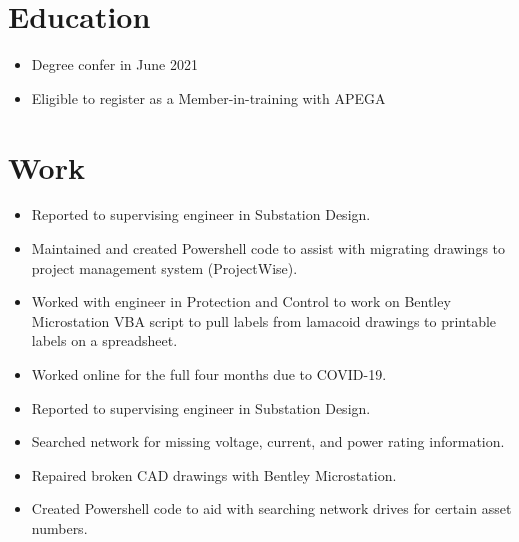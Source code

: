 \documentclass{lsanche_cv}
\begin{document}

\medskip


\smallskip


\begin{multicols*}{2}
  \section{Education}
    \begin{itemize}
      \item Degree confer in June 2021
      \item Eligible to register as a Member-in-training with APEGA
    \end{itemize}

  \section{Work}
    \begin{itemize}
      \item Reported to supervising engineer in Substation Design.
      \item Maintained and created Powershell code to assist with migrating drawings to project management system (ProjectWise).
      \item Worked with engineer in Protection and Control to work on Bentley Microstation VBA script to pull labels from lamacoid drawings to printable labels on a spreadsheet.
      \item Worked online for the full four months due to COVID-19.
    \end{itemize}

    \divider

    \begin{itemize}
      \item Reported to supervising engineer in Substation Design.
      \item Searched network for missing voltage, current, and power rating information.
      \item Repaired broken CAD drawings with Bentley Microstation.
      \item Created Powershell code to aid with searching network drives for certain asset numbers.
    \end{itemize}


\end{multicols*}
\end{document}
